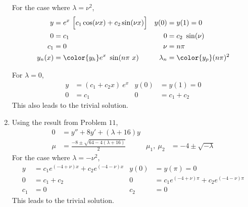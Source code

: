 \begin{enumerate}
          For the case where $ \lambda = \nu^2 $,
          \begin{align}
              y         & = e^x\ \Big[ c_1 \cos(\nu x) + c_2 \sin(\nu x) \Big] &
              y(0)      & = y(1) = 0                                             \\
              0         & = c_1                                                &
              0         & = c_2\ \sin(\nu)                                       \\
              c_1       & = 0                                                  &
              \nu       & = n\pi                                                 \\
              y_n(x)    & = \color{y_h} e^x\ \sin(n\pi\ x)                     &
              \lambda_n & = \color{y_p} (n\pi)^2
          \end{align}

          For $ \lambda = 0 $,
          \begin{align}
              y    & = (c_1 + c_2x)\ e^x &
              y(0) & = y(1) = 0            \\
              0    & = c_1               &
              0    & = c_1 + c_2
          \end{align}
          This also leads to the trivial solution.

    \item Using the result from Problem $ 11 $,
          \begin{align}
              0             & = y'' + 8y' + (\lambda + 16)y                    \\
              \mu           & = \frac{-8 \pm \sqrt{64 - 4(\lambda + 16)}}{2} &
              \mu_1,\ \mu_2 & = -4 \pm \sqrt{-\lambda}
          \end{align}
          For the case where $ \lambda = -\nu^2 $,
          \begin{align}
              y    & = c_1 e^{(-4+\nu)x} + c_2 e^{(-4-\nu)x}    &
              y(0) & = y(\pi) = 0                                 \\
              0    & = c_1 + c_2                                &
              0    & = c_1e^{(-4+\nu)\pi} + c_2 e^{(-4-\nu)\pi}   \\
              c_1  & = 0                                        &
              c_2  & = 0
          \end{align}
          This leads to the trivial solution.


\end{enumerate}
